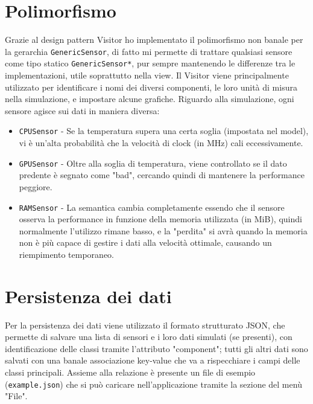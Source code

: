 \documentclass[10pt]{article}
\begin{document}
\section{Polimorfismo}
Grazie al design pattern Visitor ho implementato il polimorfismo non banale
per la gerarchia \texttt{GenericSensor}, di fatto mi permette di trattare qualsiasi
sensore come tipo statico \texttt{GenericSensor*}, pur sempre mantenendo le differenze
tra le implementazioni, utile soprattutto nella view.
Il Visitor viene principalmente utilizzato per identificare i nomi dei diversi
componenti, le loro unità di misura nella simulazione, e impostare alcune grafiche.
Riguardo alla simulazione, ogni sensore agisce sui dati in maniera diversa:
\begin{itemize}
    \item \texttt{CPUSensor} - Se la temperatura supera una certa soglia (impostata nel model),
    vi è un'alta probabilità che la velocità di clock (in MHz) cali eccessivamente.
    \item \texttt{GPUSensor} - Oltre alla soglia di temperatura, viene controllato
    se il dato predente è segnato come "bad", cercando quindi di mantenere la performance
    peggiore.
    \item \texttt{RAMSensor} - La semantica cambia completamente essendo che il sensore osserva
    la performance in funzione della memoria utilizzata (in MiB), quindi normalmente
    l'utilizzo rimane basso, e la "perdita" si avrà quando la memoria non è più capace
    di gestire i dati alla velocità ottimale, causando un riempimento temporaneo.
\end{itemize}

\section{Persistenza dei dati}
Per la persistenza dei dati viene utilizzato il formato strutturato JSON, che permette
di salvare una lista di sensori e i loro dati simulati (se presenti), con
identificazione delle classi tramite l'attributo "component"; tutti gli altri
dati sono salvati con una banale associazione key-value che va a rispecchiare i
campi delle classi principali. Assieme alla relazione è presente un file di esempio
(\texttt{example.json}) che si può caricare nell'applicazione tramite la sezione del menù "File".
\end{document}
